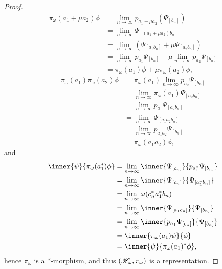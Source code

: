 \begin{proof}
    \begin{align*}
        \pi_\omega(a_1 + \mu a_2)\phi &= \lim_{n\to\infty}{p_{a_1 + \mu a_2}(\Psi_{[b_n]})}\\
                                          &= \lim_{n\to\infty}{\Psi_{[(a_1 + \mu a_2)b_n]}}\\
                                          &= \lim_{n\to\infty}{\left(\Psi_{[a_1b_n]} + \mu \Psi_{[a_2 b_n]}\right)}\\
                                          &= \lim_{n\to\infty}{p_{a_1}\Psi_{[b_n]}} + \mu \lim_{n\to\infty}{p_{a_2}\Psi_{[b_n]}}\\
                                          &= \pi_\omega(a_1)\phi + \mu\pi_\omega(a_2)\phi,
    \end{align*}
    \begin{align*}
        \pi_\omega(a_1)\pi_\omega(a_2)\phi &= \pi_\omega(a_1) \lim_{n\to\infty}{p_{a_2}\Psi_{[b_n]}}\\
                                           &= \lim_{n\to\infty}{\pi_\omega(a_1)\Psi_{[a_2b_n]}}\\
                                           &= \lim_{n\to\infty}{p_{a_1}\Psi_{[a_2b_n]}}\\
                                           &= \lim_{n\to\infty}{\Psi_{[a_1a_2b_n]}}\\
                                           &= \lim_{n\to\infty}{p_{a_1a_2}\Psi_{[b_n]}}\\
                                           &= \pi_\omega(a_1a_2)\phi,
    \end{align*}
    and
    \begin{align*}
        \inner{\psi}{\pi_\omega(a_1^*)\phi} &= \lim_{n\to\infty}{\inner{\Psi_{[c_n]}}{p_{a_1^*}\Psi_{[b_n]}}}\\
                                            &= \lim_{n\to\infty}{\inner{\Psi_{[c_n]}}{\Psi_{[a_1^*b_n]}}}\\
                                            &= \lim_{n\to\infty}{\omega(c_n^*a_1^*b_n)}\\
                                            &= \lim_{n\to\infty}{\inner{\Psi_{[a_1c_n]}}{\Psi_{[b_n]}}}\\
                                            &= \lim_{n\to\infty}{\inner{p_{a_1}\Psi_{[c_n]}}{\Psi_{[b_n]}}}\\
                                            &= \inner{\pi_{\omega}(a_1)\psi}{\phi}\\
                                            &= \inner{\psi}{\pi_{\omega}(a_1)^*\phi},
    \end{align*}
    hence \(\pi_\omega\) is a *-morphism, and thus \((\mathscr{H}_\omega, \pi_\omega)\) is a representation.


\end{proof}
